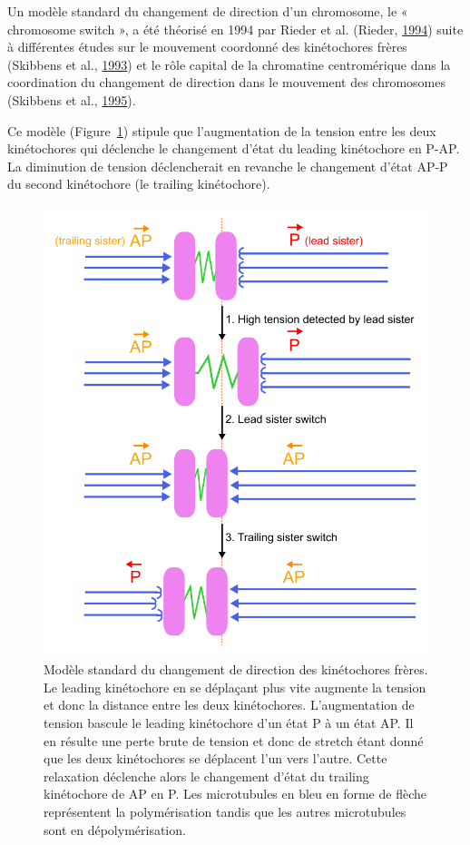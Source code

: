 \documentclass[12pt,a4paper,twoside,openright]{book}
\begin{document}
Un modèle standard du changement de direction d'un chromosome, le «
chromosome switch », a été théorisé en 1994 par Rieder et al. (Rieder,
\hyperref[ref-Rieder1994]{1994}) suite à différentes études sur le
mouvement coordonné des kinétochores frères (Skibbens et al.,
\hyperref[ref-Skibbens1993]{1993}) et le rôle capital de la chromatine
centromérique dans la coordination du changement de direction dans le
mouvement des chromosomes (Skibbens et al.,
\hyperref[ref-Skibbens1995]{1995}).

Ce modèle (Figure~\ref{fig:run-switch}) stipule que l'augmentation de la
tension entre les deux kinétochores qui déclenche le changement d'état
du leading kinétochore en P-AP. La diminution de tension déclencherait
en revanche le changement d'état AP-P du second kinétochore (le trailing
kinétochore).

\begin{figure}[htbp]
\centering
\includegraphics{figures/intro/run_switch.png}
\caption[Modèle standard du changement de direction des kinétochores frères.]{\label{fig:run-switch}Modèle
standard du changement de direction des kinétochores frères. Le leading
kinétochore en se déplaçant plus vite augmente la tension et donc la
distance entre les deux kinétochores. L'augmentation de tension bascule
le leading kinétochore d'un état P à un état AP. Il en résulte une perte
brute de tension et donc de stretch étant donné que les deux
kinétochores se déplacent l'un vers l'autre. Cette relaxation déclenche
alors le changement d'état du trailing kinétochore de AP en P. Les
microtubules en bleu en forme de flèche représentent la polymérisation
tandis que les autres microtubules sont en dépolymérisation.}
\end{figure}
\end{document}
